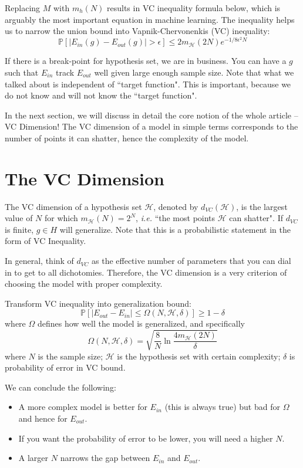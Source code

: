 \documentclass[10pt]{article}
\numberwithin{equation}{section}  %
\begin{document}
Replacing $M$ with $m_h(N)$ results in VC inequality formula below, which is arguably the most important equation in machine learning. The inequality helps us to narrow the union bound into Vapnik-Chervonenkis (VC) inequality:
\begin{equation}\label{eq:vc}
    \mathbb{P}[\vert E_{in}(g)-E_{out}(g)\vert > \epsilon] \leq 2m_\mathcal{H}(2N)e^{-1/8\epsilon^2N}
\end{equation}

If there is a break-point for hypothesis set, we are in business. You can have a $g$ such that $E_{in}$ track $E_{out}$ well given large enough sample size. Note that what we talked about is independent of ``target function". This is important, because we do not know and will not know the ``target function".

In the next section, we will discuss in detail the core notion of the whole article -- VC Dimension! The VC dimension of a model in simple terms corresponds to the number of points it can shatter, hence the complexity of the model.


\section{The VC Dimension}

The VC dimension of a hypothesis set $\mathcal{H}$, denoted by $d_{VC}(\mathcal{H})$, is the largest value of $N$ for which $m_\mathcal{H}(N)=2^N$, \textit{i.e.} ``the most points $\mathcal{H}$ can shatter".
If $d_{VC}$ is finite, $g\in H$ will generalize. Note that this is a probabilistic statement in the form of VC Inequality.

In general, think of $d_{VC}$ as the effective number of parameters that you can dial in to get to all dichotomies. Therefore, the VC dimension is a very criterion of choosing the model with proper complexity.

Transform VC inequality into generalization bound:
\begin{equation}
    \mathbb{P}[\vert E_{out}-E_{in} \vert \leq \Omega(N,\mathcal{H},\delta)]\geq 1-\delta
\end{equation}
where $\Omega$ defines how well the model is generalized, and specifically
\begin{equation}
    \Omega(N,\mathcal{H},\delta)=\sqrt{\frac{8}{N}\ln\frac{4m_\mathcal{H}(2N)}{\delta}}
\end{equation}
where $N$ is the sample size; $\mathcal{H}$ is the hypothesis set with certain complexity; $\delta$ is probability of error in VC bound.

We can conclude the following:
\begin{itemize}
    \item A more complex model is better for $E_{in}$ (this is always true) but bad for $\Omega$ and hence for $E_{out}$.
	\item If you want the probability of error to be lower, you will need a higher $N$.
	\item A larger $N$ narrows the gap between $E_{in}$ and $E_{out}$.
\end{itemize}
\end{document}
